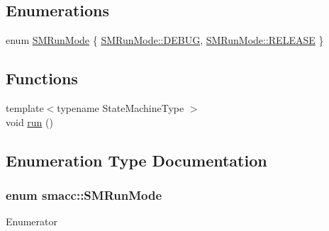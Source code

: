 \subsection*{Enumerations}
\begin{DoxyCompactItemize}
\item 
enum \hyperlink{namespacesmacc_a3e4f79486ea6ea6342dd3c712d16a4f6}{S\+M\+Run\+Mode} \{ \hyperlink{namespacesmacc_a3e4f79486ea6ea6342dd3c712d16a4f6adc30ec20708ef7b0f641ef78b7880a15}{S\+M\+Run\+Mode\+::\+D\+E\+B\+UG}, 
\hyperlink{namespacesmacc_a3e4f79486ea6ea6342dd3c712d16a4f6a7d649ef069df9885e382417c79f3d5cd}{S\+M\+Run\+Mode\+::\+R\+E\+L\+E\+A\+SE}
 \}
\end{DoxyCompactItemize}
\subsection*{Functions}
\begin{DoxyCompactItemize}
\item 
{\footnotesize template$<$typename State\+Machine\+Type $>$ }\\void \hyperlink{namespacesmacc_a47ac3b8d2968b1ba4152afd64ab66bd0}{run} ()
\end{DoxyCompactItemize}


\subsection{Enumeration Type Documentation}
\subsubsection[{\texorpdfstring{S\+M\+Run\+Mode}{SMRunMode}}]{\setlength{\rightskip}{0pt plus 5cm}enum {\bf smacc\+::\+S\+M\+Run\+Mode}\hspace{0.3cm}{\ttfamily [strong]}}\hypertarget{namespacesmacc_a3e4f79486ea6ea6342dd3c712d16a4f6}{}\label{namespacesmacc_a3e4f79486ea6ea6342dd3c712d16a4f6}
\begin{Desc}
\item[Enumerator]\par
\begin{description}
\item[{\em 
D\+E\+B\+UG\hypertarget{namespacesmacc_a3e4f79486ea6ea6342dd3c712d16a4f6adc30ec20708ef7b0f641ef78b7880a15}{}\label{namespacesmacc_a3e4f79486ea6ea6342dd3c712d16a4f6adc30ec20708ef7b0f641ef78b7880a15}
}]\item[{\em 
R\+E\+L\+E\+A\+SE\hypertarget{namespacesmacc_a3e4f79486ea6ea6342dd3c712d16a4f6a7d649ef069df9885e382417c79f3d5cd}{}\label{namespacesmacc_a3e4f79486ea6ea6342dd3c712d16a4f6a7d649ef069df9885e382417c79f3d5cd}
}]\end{description}
\end{Desc}


